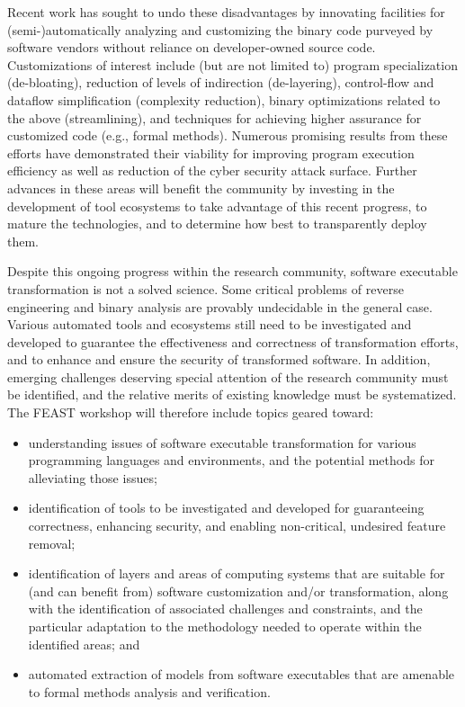 \documentclass[10pt,letterpaper]{article}
\begin{document}
Recent work has sought to undo these disadvantages by innovating facilities for (semi-)automatically analyzing and customizing the binary code purveyed by software vendors without reliance on developer-owned source code.
Customizations of interest include (but are not limited to)
program specialization (de-bloating),
reduction of levels of indirection (de-layering),
control-flow and dataflow simplification (complexity reduction),
binary optimizations related to the above (streamlining),
and techniques for achieving higher assurance for customized code (e.g., formal methods).
Numerous promising results from these efforts have demonstrated their viability for improving program execution efficiency as well as reduction of the cyber security attack surface.
Further advances in these areas will benefit the community by investing in the development of tool ecosystems to take advantage of this recent progress, to mature the technologies, and to determine how best to transparently deploy them.

Despite this ongoing progress within the research community,
software executable transformation is not a solved science.
Some critical problems of reverse engineering and binary analysis are
provably undecidable in the general case.
Various automated tools and ecosystems still need to be investigated and developed to guarantee the effectiveness and correctness of transformation efforts,
and to enhance and ensure the security of transformed software.
In addition, emerging challenges deserving special attention of the research community must be identified, and the relative merits of existing knowledge must be systematized.
The FEAST workshop will therefore include topics geared toward:
\begin{itemize}
\item understanding issues of software executable transformation for various programming languages and environments, and the potential methods for alleviating those issues;
\item identification of tools to be investigated and developed for guaranteeing correctness, enhancing security, and enabling non-critical, undesired feature removal;
\item identification of layers and areas of computing systems that are suitable for (and can benefit from) software customization and/or transformation,
along with the identification of associated challenges and constraints,
and the particular adaptation to the methodology needed to operate within the identified areas; and
\item automated extraction of models from software executables that are amenable to formal methods analysis and verification.
\end{itemize}
\end{document}

